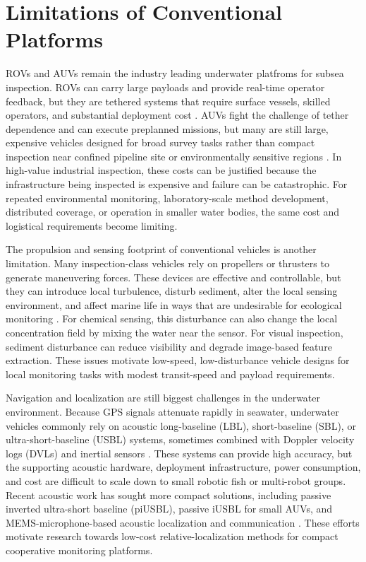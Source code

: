 \documentclass{uhcoethesis}
\begin{document}
\section{Limitations of Conventional Platforms}

ROVs and AUVs remain the industry leading underwater platfroms for subsea inspection. ROVs can carry large payloads and provide real-time operator feedback, but they are tethered systems that require surface vessels, skilled operators, and substantial deployment cost \cite{Capocci2017,Shukla2016}. AUVs fight the challenge of tether dependence and can execute preplanned missions, but many are still large, expensive vehicles designed for broad survey tasks rather than compact inspection near confined pipeline site or environmentally sensitive regions \cite{Mcleod2012,Patel2024}. In high-value industrial inspection, these costs can be justified because the infrastructure being inspected is expensive and failure can be catastrophic. For repeated environmental monitoring, laboratory-scale method development, distributed coverage, or operation in smaller water bodies, the same cost and logistical requirements become limiting.

The propulsion and sensing footprint of conventional vehicles is another limitation. Many inspection-class vehicles rely on propellers or thrusters to generate maneuvering forces. These devices are effective and controllable, but they can introduce local turbulence, disturb sediment, alter the local sensing environment, and affect marine life in ways that are undesirable for ecological monitoring \cite{Marras2012,Polverino2013}. For chemical sensing, this disturbance can also change the local concentration field by mixing the water near the sensor. For visual inspection, sediment disturbance can reduce visibility and degrade image-based feature extraction. These issues motivate low-speed, low-disturbance vehicle designs for local monitoring tasks with modest transit-speed and payload requirements.

Navigation and localization are still biggest challenges in the underwater environment. Because GPS signals attenuate rapidly in seawater, underwater vehicles commonly rely on acoustic long-baseline (LBL), short-baseline (SBL), or ultra-short-baseline (USBL) systems, sometimes combined with Doppler velocity logs (DVLs) and inertial sensors \cite{Luo2021,Su2020,Zekavat2019}. These systems can provide high accuracy, but the supporting acoustic hardware, deployment infrastructure, power consumption, and cost are difficult to scale down to small robotic fish or multi-robot groups. Recent acoustic work has sought more compact solutions, including passive inverted ultra-short baseline (piUSBL), passive iUSBL for small AUVs, and MEMS-microphone-based acoustic localization and communication \cite{Rypkema2019,Wang2022,Hinduja2022}. These efforts motivate research towards  low-cost relative-localization methods for compact cooperative monitoring platforms.
\end{document}
